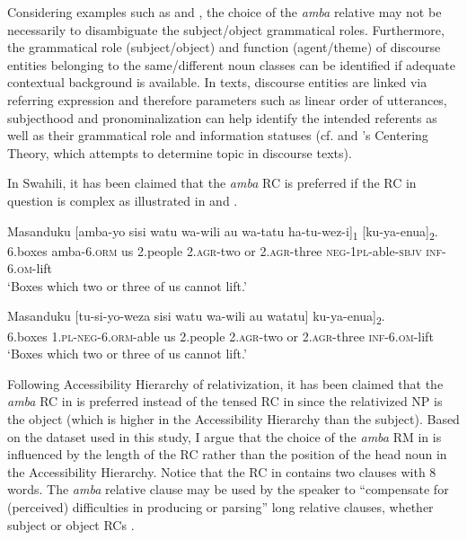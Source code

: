 \documentclass[output=paper,colorlinks,citecolor=brown]{langscibook}
\begin{document}
Considering examples such as  and , the choice of the \textit{amba} relative may not be necessarily to disambiguate the subject/object grammatical roles. Furthermore, the grammatical role (subject/object) and function (agent/theme) of discourse entities belonging to the same/different noun classes can be identified if adequate contextual background is available. In texts, discourse entities are linked via referring expression and therefore parameters such as linear order of utterances, subjecthood and pronominalization can help identify the intended referents as well as their grammatical role and information statuses (cf. \citealt{GroszEtAl1995} and \citeauthor{GroszSidner1998}'s \citeyear{GroszSidner1998} Centering Theory, which attempts to determine topic in discourse texts).

In Swahili, it has been claimed that the \textit{amba} RC is preferred if the RC in question is complex as illustrated in  and .

\ea%
    \label{ex:mwamzandi:12}
    \gll    Masanduku  [amba-yo sisi watu wa-wili au wa-tatu ha-tu-wez-i]\textsubscript{1} [ku-ya-enua]\textsubscript{2}.\\
            6.boxes  amba\textsc{-6.orm} us 2.people \textsc{2.agr-}two or \textsc{2.agr-}three  \textsc{neg-1pl-}able\textsc{-sbjv} \textsc{inf-6.om-}lift\\
    \glt    ‘Boxes which two or three of us cannot lift.’
\z

\ea%
    \label{ex:mwamzandi:13}
    \gll    Masanduku [tu-si-yo-weza sisi watu wa-wili au watatu] ku-ya-enua]\textsubscript{2}.\\
            6.boxes  \textsc{1.pl-neg-6.orm-}able us 2.people \textsc{2.agr-}two or \textsc{2.agr-}three \textsc{inf-6.om-}lift\\
    \glt    ‘Boxes which two or three of us cannot lift.’ \hfill \citep[310]{Ashton1944}
\z

Following  Accessibility Hierarchy of relativization, it has been claimed that the \textit{amba} RC in  is preferred  instead of the tensed RC in  since the relativized NP is the object (which is higher in the Accessibility Hierarchy than the subject). Based on the dataset used in this study, I argue that the choice of the \textit{amba} RM in  is influenced by the length of the RC rather than the position of the head noun in the Accessibility Hierarchy. Notice that the RC in  contains two clauses with 8 words. The \textit{amba} relative clause may be used by the speaker to “compensate for (perceived) difficulties in producing or parsing” long relative clauses, whether subject or object RCs \citep[133]{Green1996}.
\end{document}
